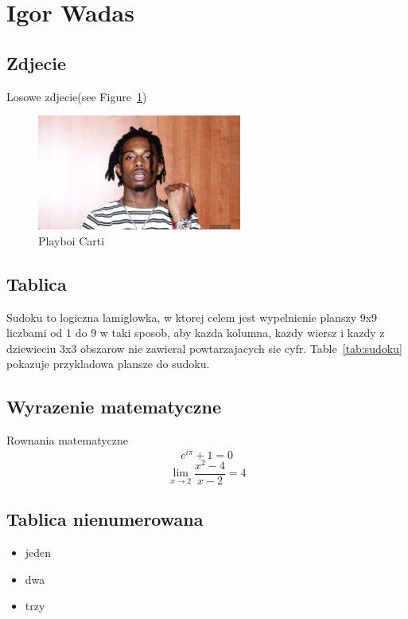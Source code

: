 \section{Igor Wadas}
\label{sec:iwadas}

\subsection{Zdjecie}
Losowe zdjecie(see Figure~\ref{fig:carti})


\begin{figure}[htbp]
    \centering
    \includegraphics[width=0.6\textwidth]{pictures/IgorWadas.jpg}
    \caption{Playboi Carti}
    \label{fig:carti}
\end{figure}

\subsection{Tablica}
Sudoku to logiczna lamiglowka, w ktorej celem jest wypelnienie planszy 9x9 liczbami od 1 do 9 w taki sposob, aby kazda kolumna, kazdy wiersz i kazdy z dziewieciu 3x3 obszarow nie zawieral powtarzajacych sie cyfr. Table~\ref{tab:sudoku} pokazuje przykladowa plansze do sudoku.


\subsection{Wyrazenie matematyczne}
Rownania matematyczne
$$ e^{i\pi} + 1 = 0$$
$$\lim_{x \to 2} \frac{x^2 - 4}{x - 2} = 4$$

\subsection{Tablica nienumerowana}
\begin{itemize}
  \item jeden
  \item dwa
  \item trzy
\end{itemize}

